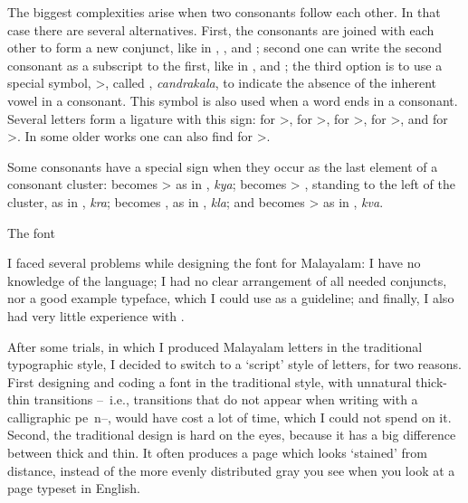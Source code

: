 \noindent The biggest complexities arise when two consonants follow
each other. In that case there are several alternatives. First, the
consonants are joined with each other to form a new conjunct, like in
{\mm {}}, {\mm {}}, and {\mm {}}; second one can write the second consonant as
a subscript to the first, like in {\mm {}}, and {\mm {}}; the third option
is to use a special symbol, {\mm {}>}, called {\mm {}},
{\it{\mmtr candrakala}}, to indicate the absence of the inherent vowel in
a consonant. This symbol is also used when a word ends in a consonant.
Several letters form a ligature with this sign: {\mm {}} for
{\mm {}>}, {\mm {}} for {\mm {}>}, {\mm {}} for {\mm {}>}, {\mm {}} for
{\mm {}>}, and {\mm {}} for {\mm {}>}. In some older works one can also find {\mm {}} for {\mm {}>}.

Some consonants have a special sign when they occur as the last
element of a consonant cluster:
{\mm {}} becomes {\mm {}\hbox{}>} as in {\mm {}}, {\it{\mmtr kya}};
{\mm {}} becomes {\mm {}>\hbox{}} , standing to the left of the cluster, as in
{\mm {}}, {\it{\mmtr kra}};
{\mm {}} becomes {\mm {}}, as in {\mm {}}, {\it{\mmtr kla}}; and
{\mm {}} becomes {\mm {}\hbox{}>} as in {\mm {}}, {\it{\mmtr kva}}.

\beginsection The font

I faced several problems while designing the font for Malayalam: I
have no knowledge of the language; I had no clear arrangement of all
needed conjuncts, nor a good example typeface, which I could use as a
guideline; and finally, I also had very little experience with \MF.

After some trials, in which I produced Malayalam letters in the
traditional typographic style, I decided to switch to a `script' style
of letters, for two reasons. First designing and coding a font in the
traditional style, with unnatural thick-thin transitions --~i.e.,
transitions that do not appear when writing with a calligraphic
pe~n--, would have cost a lot of time, which I could not spend on
it. Second, the traditional design is hard on the eyes, because it has
a big difference between thick and thin. It often produces a page
which looks `stained' from distance, instead of the more evenly
distributed gray you see when you look at a page typeset in English.

